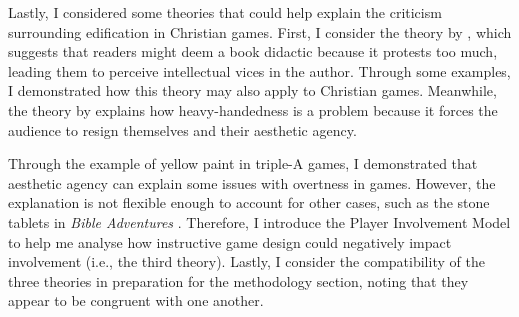  Lastly, I considered some theories that could help explain the criticism surrounding edification in Christian games. First, I consider the theory by \textcite{repp_whats_2012}, which suggests that readers might deem a book didactic because it protests too much, leading them to perceive intellectual vices in the author. Through some examples, I demonstrated how this theory may also apply to Christian games. Meanwhile, the theory by \textcite{king_virtue_2017} explains how heavy-handedness is a problem because it forces the audience to resign themselves and their aesthetic agency. 
 
Through the example of yellow paint in triple-A games, I demonstrated that aesthetic agency can explain some issues with overtness in games. However, the explanation is not flexible enough to account for other cases, such as the stone tablets in \textit{Bible Adventures} \parencite{wisdom_tree_bible_1991}. Therefore, I introduce the Player Involvement Model \parencite{calleja_in_game_2011} to help me analyse how instructive game design could negatively impact involvement (i.e., the third theory). Lastly, I consider the compatibility of the three theories in preparation for the methodology section, noting that they appear to be congruent with one another.

